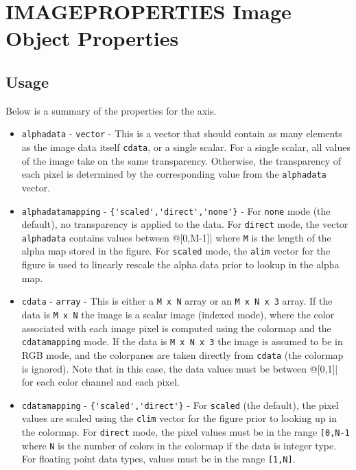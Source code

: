 \section{IMAGEPROPERTIES Image Object Properties}

\subsection{Usage}

Below is a summary of the properties for the axis.
\begin{itemize}
\item  \verb|alphadata| - \verb|vector| - This is a vector that
 should contain as many elements as the image data itself \verb|cdata|,
 or a single scalar.  For a single scalar, all values of the image
 take on the same transparency.  Otherwise, the transparency of
 each pixel is determined by the corresponding value from the \verb|alphadata|
 vector.

\item  \verb|alphadatamapping| - \verb|{'scaled','direct','none'}| - For \verb|none|
 mode (the default), no transparency is applied to the data.  For \verb|direct|
 mode, the vector \verb|alphadata| contains values between @[0,M-1]| where
 \verb|M| is the length of the alpha map stored in the figure.  For \verb|scaled|
 mode, the \verb|alim| vector for the figure is used to linearly rescale the 
 alpha data prior to lookup in the alpha map. 

\item  \verb|cdata| - \verb|array| - This is either a \verb|M x N| array or an 
  \verb|M x N x 3| array.  If the data is \verb|M x N| the image is a scalar
 image (indexed mode), where the color associated with each image pixel
 is computed using the colormap and the \verb|cdatamapping| mode.  If the
 data is \verb|M x N x 3| the image is assumed to be in RGB mode, and the
 colorpanes are taken directly from \verb|cdata| (the colormap is ignored).
 Note that in this case, the data values must be between @[0,1]| for each
 color channel and each pixel.

\item  \verb|cdatamapping| - \verb|{'scaled','direct'}| - For \verb|scaled| (the
 default), the pixel values are scaled using the \verb|clim| vector for the
 figure prior to looking up in the colormap.  For \verb|direct| mode, the
 pixel values must be in the range \verb|[0,N-1| where \verb|N| is the number of
 colors in the colormap if the data is integer type.  For floating point
 data types, values must be in the range \verb|[1,N]|.


\end{itemize}
